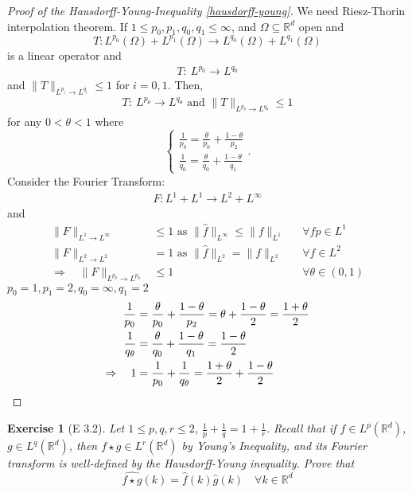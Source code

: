 \documentclass{report}
\theoremstyle{tommy}
\newtheorem{ex}[defn]{Exercise}
\begin{document}
  \begin{proof}[Proof of the Hausdorff-Young-Inequality \ref{hausdorff-young}]
    We need Riesz-Thorin interpolation theorem. If \(1 \le p_0, p_1, q_0, q_1 \le \infty\), and \(\Omega \subseteq \mathbb{R}^d\) open and 
    \[T: L^{p_0}(\Omega) + L^{p_1}(\Omega) \longrightarrow L^{q_0}(\Omega) + L^{q_1}(\Omega)\]
    is a linear operator and
    \begin{align*}
      T: \ L^{p_0} \to L^{q_0}
    \end{align*}
    and \(\|T\|_{L^{p_i} \to L^{q_i}} \le 1\) for \(i = 0, 1.\) Then,
    \begin{align*}
      T: \ L^{p_\theta} \to L^{q_\theta} \text{ and } \|T\|_{L^{p_\theta} \to L^{q_\theta}} \le 1
    \end{align*}  
    for any \(0 < \theta < 1\) where 
    \[\begin{cases}
      \frac{1}{p_0} = \frac{\theta}{p_0} + \frac{1 - \theta}{p_2} \\
      \frac{1}{q_0} = \frac{\theta}{q_0} + \frac{1 - \theta}{q_1}
    \end{cases}.\]
    Consider the Fourier Transform:
    \begin{align*}
      F: L^1 + L^1 \to L^2 + L^\infty 
    \end{align*}
    and
    \begin{align*}
      \|F\|_{L^1 \to L^\infty} &\le 1 \text{ as } \|\hat f\|_{L^\infty} \le \|f\|_{L^1} &&\forall f p \in L^1 \\
      \|F\|_{L^2 \to L^2} &= 1 \text{ as } \| \hat f \|_{L^2} = \|f\|_{L^2} &&\forall f \in L^2 \\
      \Rightarrow\quad  \|F\|_{L^{p_\theta} \to L^{p_\theta}} &\le 1 &&\forall \theta \in (0,1)
    \end{align*}
    \(p_0 = 1, p_1 = 2, q_0 = \infty, q_1 = 2\)
    \begin{align*}
      \frac{1}{p_0} &= \frac{\theta}{p_0} + \frac{1 - \theta}{p_2} = \theta + \frac{1 - \theta}{2} = \frac{1 + \theta}{2} \\
      \frac{1}{q_\theta} &= \frac{\theta}{q_0} + \frac{1 - \theta}{q_1} = \frac{1 - \theta}{2} \\
      \Rightarrow \quad 1 &= \frac{1}{p_0} + \frac{1}{q_\theta} = \frac{1 + \theta}{2} + \frac{1 - \theta}{2} \qedhere
    \end{align*}
  \end{proof}


  \begin{ex}[E 3.2]\label{fourier-convolution-product}
    Let \(1 \le p, q, r \le 2\), \(\frac{1}{p} + \frac{1}{q} = 1 + \frac{1}{r}\). Recall that if \(f \in L^p(\mathbb{R}^d)\), \(g \in L^q(\mathbb{R}^d)\), then \(f \star g \in L^r(\mathbb{R}^d)\) by Young's Inequality, and its Fourier transform is well-defined by the Hausdorff-Young inequality. Prove that 
    \[\widehat{f \star g}(k) = \hat f(k) \hat g(k) \quad \forall k \in \mathbb{R}^d\]
  \end{ex}
\end{document}
